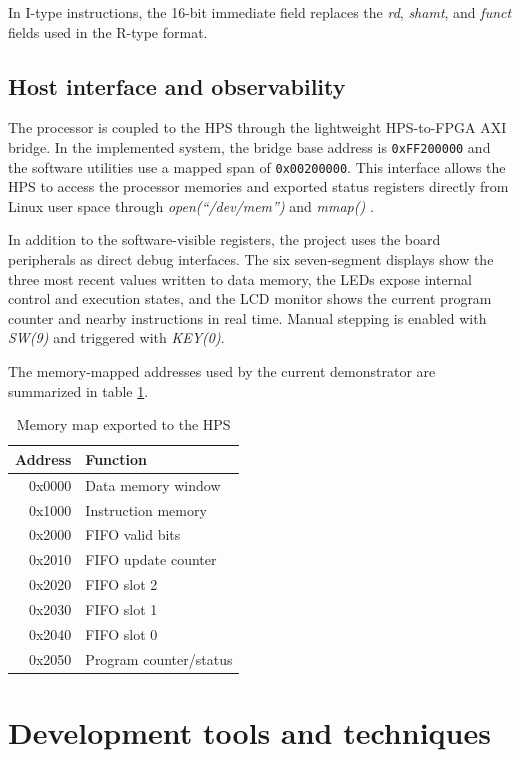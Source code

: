 \documentclass[a4paper,11pt]{scrartcl}
\begin{document}
In I-type instructions, the 16-bit immediate field replaces the \emph{rd}, \emph{shamt}, and \emph{funct} fields used in the R-type format.
\subsection{Host interface and observability}
\label{sec:orgd185bc8}

The processor is coupled to the HPS through the lightweight HPS-to-FPGA AXI bridge. In the implemented system, the bridge base address is \texttt{0xFF200000} and the software utilities use a mapped span of \texttt{0x00200000}. This interface allows the HPS to access the processor memories and exported status registers directly from Linux user space through \emph{open(``/dev/mem'')} and \emph{mmap()} \cite{terasic_technologies_de10-standard_2018}.

In addition to the software-visible registers, the project uses the board peripherals as direct debug interfaces. The six seven-segment displays show the three most recent values written to data memory, the LEDs expose internal control and execution states, and the LCD monitor shows the current program counter and nearby instructions in real time. Manual stepping is enabled with \emph{SW(9)} and triggered with \emph{KEY(0)}.

The memory-mapped addresses used by the current demonstrator are summarized in table \ref{tab:memory_map}.

\begin{table}[htbp]
\caption{\label{tab:memory_map}Memory map exported to the HPS}
\centering
\begin{tabular}{rl}
\hline
Address & Function\\
\hline
0x0000 & Data memory window\\
0x1000 & Instruction memory\\
0x2000 & FIFO valid bits\\
0x2010 & FIFO update counter\\
0x2020 & FIFO slot 2\\
0x2030 & FIFO slot 1\\
0x2040 & FIFO slot 0\\
0x2050 & Program counter/status\\
\hline
\end{tabular}
\end{table}
\section{Development tools and techniques}
\label{sec:org2740a34}
\end{document}
